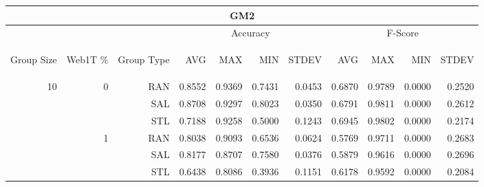 \begin{center}
\begin{table}[htbp] 
 \begin{center}
\begin{tabular}{ | r | r | r | r | r | r | r | r | r | r | r |}
\hline
\multicolumn{11}{|c|}{GM2}\\
\hline
 & & & \multicolumn{4}{|c|}{Accuracy} & \multicolumn{4}{|c|}{F-Score}\\ \cline{4-11}
\begin{sideways}Group Size\end{sideways} & \begin{sideways}Web1T \%\end{sideways} & \begin{sideways}Group Type\end{sideways} & \begin{sideways}AVG\end{sideways} & \begin{sideways}MAX\end{sideways} & \begin{sideways}MIN\end{sideways} & \begin{sideways}STDEV\end{sideways} & \begin{sideways}AVG\end{sideways} & \begin{sideways}MAX\end{sideways} & \begin{sideways}MIN\end{sideways} & \begin{sideways}STDEV\end{sideways}\\
\hline
\multirow{18}{*}{10}
 & \multirow{3}{*}{0} & RAN & 0.8552 & 0.9369 & 0.7431 & 0.0453 & 0.6870 & 0.9789 & 0.0000 & 0.2520\\ \cline{3-11}
 &   & SAL & 0.8708 & 0.9297 & 0.8023 & 0.0350 & 0.6791 & 0.9811 & 0.0000 & 0.2612\\ \cline{3-11}
 &   & STL & 0.7188 & 0.9258 & 0.5000 & 0.1243 & 0.6945 & 0.9802 & 0.0000 & 0.2174\\ \cline{2-11}
 & \multirow{3}{*}{1} & RAN & 0.8038 & 0.9093 & 0.6536 & 0.0624 & 0.5769 & 0.9711 & 0.0000 & 0.2683\\ \cline{3-11}
 &   & SAL & 0.8177 & 0.8707 & 0.7580 & 0.0376 & 0.5879 & 0.9616 & 0.0000 & 0.2696\\ \cline{3-11}
 &   & STL & 0.6438 & 0.8086 & 0.3936 & 0.1151 & 0.6178 & 0.9592 & 0.0000 & 0.2084\\ \cline{2-11}

\end{tabular}
\end{center}
\end{table}
\end{center}
